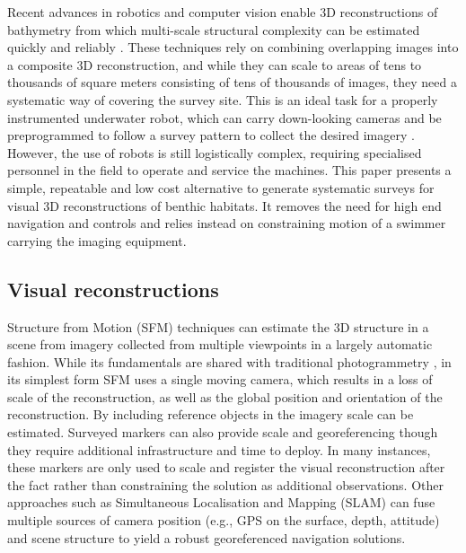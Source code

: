 \newline

Recent advances in robotics and computer vision enable 3D reconstructions of bathymetry from which multi-scale structural complexity can be estimated quickly and reliably \cite{Friedman_2012}. These techniques rely on combining overlapping images into a composite 3D reconstruction, and while they can scale to areas of tens to thousands of square meters consisting of tens of thousands of images, they need a systematic way of covering the survey site. This is an ideal task for a properly instrumented underwater robot, which can carry down-looking cameras and be preprogrammed to follow a survey pattern to collect the desired imagery \cite{Williams_2012}. However, the use of robots is still logistically complex, requiring specialised personnel in the field to operate and service the machines. 
This paper presents a simple, repeatable and low cost alternative to generate systematic surveys for visual 3D reconstructions of benthic habitats. It removes the need for high end navigation and controls and relies instead on constraining motion of a swimmer carrying the imaging equipment. 

\subsection{Visual reconstructions}
Structure from Motion (SFM) techniques \cite{Hartley_2004} can estimate the 3D structure in a scene from imagery collected from multiple viewpoints in a largely automatic fashion. While its fundamentals are shared with traditional photogrammetry \cite{Jones_1982}, in its simplest form SFM uses a single moving camera, which results in a loss of scale of the reconstruction, as well as the global position and orientation of the reconstruction. By including reference objects in the imagery scale can be estimated. Surveyed markers can also provide scale and georeferencing though they require additional infrastructure and time to deploy. In many instances, these markers are only used to scale and register the visual reconstruction after the fact rather than constraining the solution as additional observations.
Other approaches such as Simultaneous Localisation and Mapping (SLAM) \cite{Thrun_2008} can fuse multiple sources of camera position (e.g., GPS on the surface, depth, attitude) and scene structure to yield a robust georeferenced navigation solutions.

